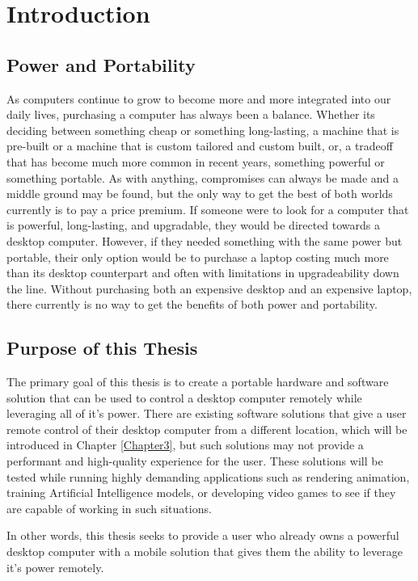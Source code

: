 \chapter{Introduction}

\label{Chapter1}

\section{Power and Portability}

As computers continue to grow to become more and more integrated into our daily lives, purchasing a computer has always been a balance.
Whether its deciding between something cheap or something long-lasting, a machine that is pre-built or a machine that is custom tailored and custom built, or, a tradeoff that has become much more common in recent years, something powerful or something portable.
As with anything, compromises can always be made and a middle ground may be found, but the only way to get the best of both worlds currently is to pay a price premium.
If someone were to look for a computer that is powerful, long-lasting, and upgradable, they would be directed towards a desktop computer.
However, if they needed something with the same power but portable, their only option would be to purchase a laptop costing much more than its desktop counterpart and often with limitations in upgradeability down the line.
Without purchasing both an expensive desktop and an expensive laptop, there currently is no way to get the benefits of both power and portability.


\section{Purpose of this Thesis}

The primary goal of this thesis is to create a portable hardware and software solution that can be used to control a desktop computer remotely while leveraging all of it's power.
There are existing software solutions that give a user remote control of their desktop computer from a different location, which will be introduced in Chapter \ref{Chapter3}, but such solutions may not provide a performant and high-quality  experience for the user.
These solutions will be tested while running highly demanding applications such as rendering animation, training Artificial Intelligence models, or developing video games to see if they are capable of working in such situations.

In other words, this thesis seeks to provide a user who already owns a powerful desktop computer with a mobile solution that gives them the ability to leverage it's power remotely.


